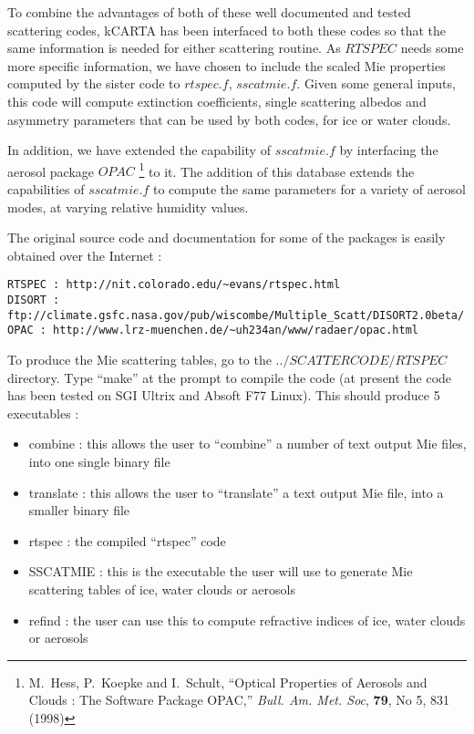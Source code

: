 \documentclass[12pt]{article}
\newcommand{\kc}{\textsf{kCARTA}\xspace}
\begin{document}
To combine the advantages of both of these well documented and tested 
scattering codes, \kc has been interfaced to both these codes so that the 
same information is needed for either scattering routine. As $RTSPEC$ needs
some more specific information, we have chosen to include the scaled Mie
properties computed by the sister code to $rtspec.f$, $sscatmie.f$. Given
some general inputs, this code will compute extinction coefficients, single 
scattering albedos and asymmetry parameters that can be used by both codes,
for ice or water clouds.

In addition, we have extended the capability of $sscatmie.f$ by interfacing
the aerosol package $OPAC$ 
\footnote{M.~Hess, P.~Koepke and I.~Schult, ``Optical Properties of Aerosols 
and Clouds : The Software Package OPAC,'' {\em Bull. Am. Met. Soc}, {\bf 79}, 
No 5, 831 (1998)} to it. The addition of this database extends the 
capabilities of $sscatmie.f$ to compute the same parameters 
for a variety of aerosol modes, at varying relative humidity values.

The original source code and documentation for some of the packages is 
easily obtained over the Internet : \\
\begin{verbatim}
RTSPEC : http://nit.colorado.edu/~evans/rtspec.html
DISORT : ftp://climate.gsfc.nasa.gov/pub/wiscombe/Multiple_Scatt/DISORT2.0beta/
OPAC : http://www.lrz-muenchen.de/~uh234an/www/radaer/opac.html
\end{verbatim}

To produce the Mie scattering tables, go to the $../SCATTERCODE/RTSPEC$ 
directory. Type ``make'' at the prompt to compile the code (at present the
code has been tested on SGI Ultrix and Absoft F77 Linux).
This should produce 5 executables :\\
\begin{itemize}
\item combine : this allows the user to ``combine'' a number of text output
                Mie files, into one single binary file
\item translate : this allows the user to ``translate'' a text output
                Mie file, into a smaller binary file
\item rtspec : the compiled ``rtspec'' code
\item SSCATMIE : this is the executable the user will use to generate Mie
                 scattering tables of ice, water clouds or aerosols
\item refind : the user can use this to compute refractive indices of ice, 
               water clouds or aerosols
\end{itemize}
\end{document}

